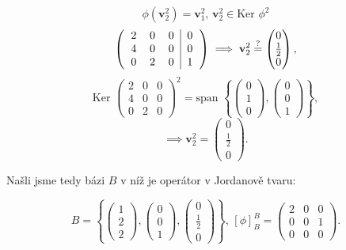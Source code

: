 \documentclass{article}
\begin{document}
$$\phi(\textbf{v}_2^2)=\textbf{v}_1^2,\, \textbf{v}_2^2 \in \text{Ker }\phi^2$$
$$\left(\begin{tabular}{ c c c | c }
    2 & 0 & 0 & 0\\
    4 & 0 & 0 & 0\\
    0 & 2 & 0 & 1
\end{tabular}\right)\implies\textbf{v}_2^2 \stackrel{?}{=} \begin{pmatrix}
   0 \\ \frac{1}{2} \\ 0
\end{pmatrix},$$
$$\text{Ker }\begin{pmatrix}
    2 & 0 & 0\\
    4 & 0 & 0\\
    0 & 2 & 0
\end{pmatrix}^2 = \text{span }\left\{\begin{pmatrix}
   0 \\ 1 \\ 0
\end{pmatrix}, \begin{pmatrix}
   0 \\ 0 \\ 1
\end{pmatrix}\right\},$$
$$\implies \textbf{v}_2^2 = \begin{pmatrix}
   0 \\ \frac{1}{2} \\ 0
\end{pmatrix}.$$

Našli jsme tedy bázi $B$ v níž je operátor v Jordanově tvaru:

$$B = \left\{\begin{pmatrix}
   1 \\ 2 \\ 2
\end{pmatrix}, \begin{pmatrix}
   0 \\ 0 \\ 1
\end{pmatrix}, \begin{pmatrix}
   0 \\ \frac{1}{2} \\ 0
\end{pmatrix}\right\}, \, [\phi]_B^B = \begin{pmatrix}
   2 & 0 & 0 \\
    0 & 0 & 1 \\
    0 & 0 & 0
\end{pmatrix}.$$
\end{document}
